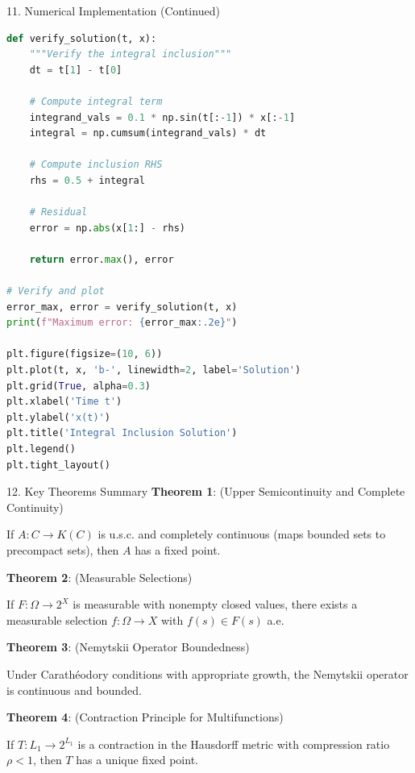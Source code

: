 \documentclass[aspectratio=169,10pt]{beamer}
\begin{document}
\begin{frame}[fragile]{11. Numerical Implementation (Continued)}
    \begin{lstlisting}[language=Python, caption=Verification and Visualization]
def verify_solution(t, x):
    """Verify the integral inclusion"""
    dt = t[1] - t[0]

    # Compute integral term
    integrand_vals = 0.1 * np.sin(t[:-1]) * x[:-1]
    integral = np.cumsum(integrand_vals) * dt

    # Compute inclusion RHS
    rhs = 0.5 + integral

    # Residual
    error = np.abs(x[1:] - rhs)

    return error.max(), error

# Verify and plot
error_max, error = verify_solution(t, x)
print(f"Maximum error: {error_max:.2e}")

plt.figure(figsize=(10, 6))
plt.plot(t, x, 'b-', linewidth=2, label='Solution')
plt.grid(True, alpha=0.3)
plt.xlabel('Time t')
plt.ylabel('x(t)')
plt.title('Integral Inclusion Solution')
plt.legend()
plt.tight_layout()
    \end{lstlisting}
\end{frame}

\begin{frame}[allowframebreaks]{12. Key Theorems Summary}
    \textbf{Theorem 1}: (Upper Semicontinuity and Complete Continuity)

    If $A: C \to K(C)$ is u.s.c. and completely continuous (maps bounded sets to precompact sets), then $A$ has a fixed point.

    \vspace{0.4cm}
    \textbf{Theorem 2}: (Measurable Selections)

    If $F: \Omega \to 2^X$ is measurable with nonempty closed values, there exists a measurable selection $f: \Omega \to X$ with $f(s) \in F(s)$ a.e.

    \vspace{0.4cm}
    \textbf{Theorem 3}: (Nemytskii Operator Boundedness)

    Under Carathéodory conditions with appropriate growth, the Nemytskii operator is continuous and bounded.

    \vspace{0.4cm}
    \textbf{Theorem 4}: (Contraction Principle for Multifunctions)

    If $T: L_1 \to 2^{L_1}$ is a contraction in the Hausdorff metric with compression ratio $\rho < 1$, then $T$ has a unique fixed point.
\end{frame}
\end{document}
